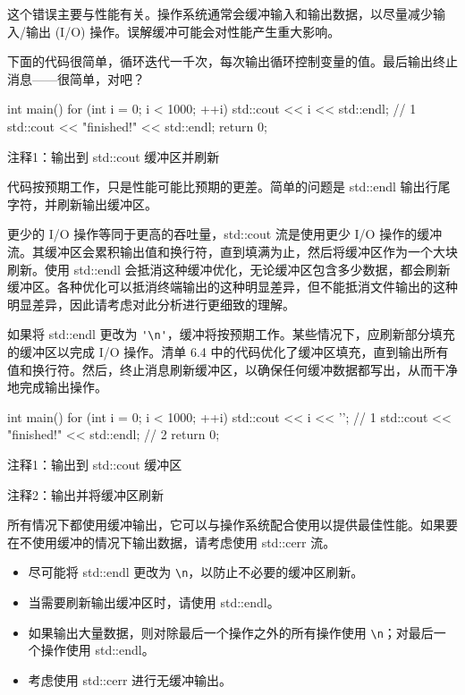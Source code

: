 这个错误主要与性能有关。操作系统通常会缓冲输入和输出数据，以尽量减少输入/输出 (I/O) 操作。误解缓冲可能会对性能产生重大影响。


下面的代码很简单，循环迭代一千次，每次输出循环控制变量的值。最后输出终止消息——很简单，对吧？


\begin{cpp}
int main() {
  for (int i = 0; i < 1000; ++i)
    std::cout << i << std::endl; // 1
  std::cout << "finished!" << std::endl;
  return 0;
}
\end{cpp}

{\footnotesize
注释1：输出到 std::cout 缓冲区并刷新
}


代码按预期工作，只是性能可能比预期的更差。简单的问题是 std::endl 输出行尾字符，并刷新输出缓冲区。

更少的 I/O 操作等同于更高的吞吐量，std::cout 流是使用更少 I/O 操作的缓冲流。其缓冲区会累积输出值和换行符，直到填满为止，然后将缓冲区作为一个大块刷新。使用 std::endl 会抵消这种缓冲优化，无论缓冲区包含多少数据，都会刷新缓冲区。各种优化可以抵消终端输出的这种明显差异，但不能抵消文件输出的这种明显差异，因此请考虑对此分析进行更细致的理解。


如果将 std::endl 更改为 \verb|'\n'|，缓冲将按预期工作。某些情况下，应刷新部分填充的缓冲区以完成 I/O 操作。清单 6.4 中的代码优化了缓冲区填充，直到输出所有值和换行符。然后，终止消息刷新缓冲区，以确保任何缓冲数据都写出，从而干净地完成输出操作。


\begin{cpp}
int main() {
  for (int i = 0; i < 1000; ++i)
    std::cout << i << '\n'; // 1
  std::cout << "finished!" << std::endl; // 2
  return 0;
}
\end{cpp}

{\footnotesize
注释1：输出到 std::cout 缓冲区

注释2：输出并将缓冲区刷新
}

所有情况下都使用缓冲输出，它可以与操作系统配合使用以提供最佳性能。如果要在不使用缓冲的情况下输出数据，请考虑使用 std::cerr 流。


\begin{itemize}
\item
尽可能将 std::endl 更改为 \verb|\n|，以防止不必要的缓冲区刷新。

\item
当需要刷新输出缓冲区时，请使用 std::endl。

\item
如果输出大量数据，则对除最后一个操作之外的所有操作使用 \verb|\n|；对最后一个操作使用 std::endl。

\item
考虑使用 std::cerr 进行无缓冲输出。
\end{itemize}






